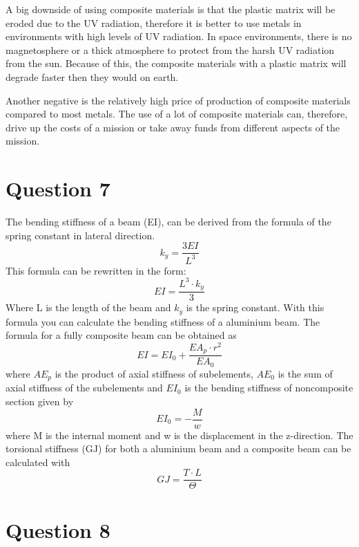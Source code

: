 A big downside of using composite materials is that the plastic matrix will be eroded due to the UV radiation, therefore it is better to use metals in environments with high levels of UV radiation. In space environments, there is no magnetosphere or a thick atmosphere to protect from the harsh UV radiation from the sun. Because of this, the composite materials with a plastic matrix will degrade faster then they would on earth. 

Another negative is the relatively high price of production of composite materials compared to most metals. The use of a lot of composite materials can, therefore, drive up the costs of a mission or take away funds from different aspects of the mission.

\section{Question 7}
The bending stiffness of a beam (EI), can be derived from the formula of the spring constant in lateral direction.
\begin{equation}
    k_y= \frac{3EI}{L^3}
\end{equation}
This formula can be rewritten in the form:
\begin{equation}
    EI=\frac{L^3 \cdot k_y}{3}
\end{equation}
Where L is the length of the beam and $k_y$ is the spring constant. With this formula you can calculate the bending stiffness of a aluminium beam. The formula for a fully composite beam can be obtained as\cite{Composite-beams}
\begin{equation}
    EI= EI_0 + \frac{EA_p \cdot r^2}{EA_0}
\end{equation}
where $AE_p$ is the product of axial stiffness of subelements, $AE_0$ is the sum of axial stiffness of the subelements and $EI_0$ is the bending stiffness of noncomposite section given by
\begin{equation}
    EI_0=-\frac{M}{w}
\end{equation}
where M is the internal moment and w is the displacement in the z-direction.
The torsional stiffness (GJ) for both a aluminium beam and a composite beam can be calculated with
\begin{equation}
    GJ = \frac{T\cdot L}{\Theta}
\end{equation}

\section{Question 8}

